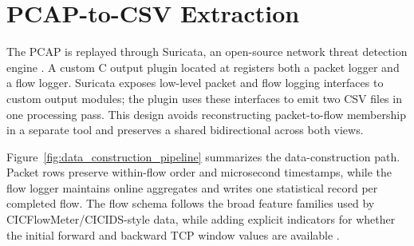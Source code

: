 \documentclass[11pt,fleqn]{report}
\begin{document}
\section{PCAP-to-CSV Extraction}
\label{subsec:pcap_extraction}

The PCAP is replayed through Suricata, an open-source network threat detection
engine \cite{Roesch1999,SuricataGuide2026}. A custom C output plugin located at
 registers both a packet logger and
a flow logger. Suricata exposes low-level packet and flow logging interfaces to
custom output modules; the plugin uses these interfaces to emit two CSV files
in one processing pass. This design avoids reconstructing packet-to-flow
membership in a separate tool and preserves a shared bidirectional
 across both views.

Figure~\ref{fig:data_construction_pipeline} summarizes the data-construction
path. Packet rows preserve within-flow order and microsecond timestamps, while
the flow logger maintains online aggregates and writes one statistical record
per completed flow. The flow schema follows the broad feature families used by
CICFlowMeter/CICIDS-style data, while adding explicit indicators for whether
the initial forward and backward TCP window values are available
\cite{Sharafaldin2018CICIDS}.
\end{document}
